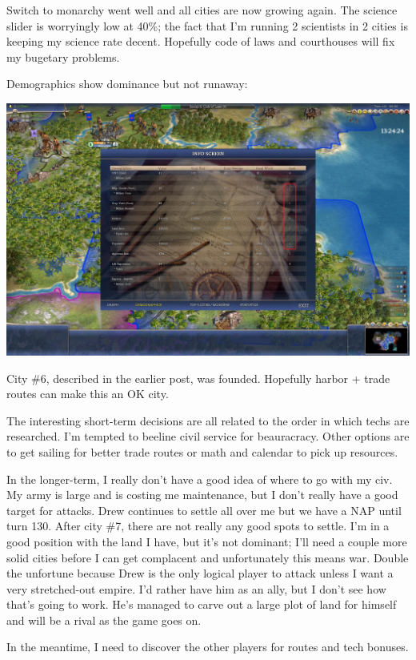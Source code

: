 \documentclass[10pt]{article}
\begin{document}
Switch to monarchy went well and all cities are now growing again. The
science slider is worryingly low at 40\%; the fact that I'm running 2
scientists in 2 cities is keeping my science rate decent. Hopefully
code of laws and courthouses will fix my bugetary problems.

Demographics show dominance but not runaway:

\includegraphics[width=1.0\textwidth]{turn103}

City \#6, described in the earlier post, was founded. Hopefully harbor + trade routes can make this an OK city.

The interesting short-term decisions are all related to the order in
which techs are researched. I'm tempted to beeline civil service for
beauracracy. Other options are to get sailing for better trade routes
or math and calendar to pick up resources.

In the longer-term, I really don't have a good idea of where to go
with my civ. My army is large and is costing me maintenance, but I
don't really have a good target for attacks. Drew continues to settle
all over me but we have a NAP until turn 130. After city \#7, there are
not really any good spots to settle. I'm in a good position with the
land I have, but it's not dominant; I'll need a couple more solid
cities before I can get complacent and unfortunately this means
war. Double the unfortune because Drew is the only logical player to
attack unless I want a very stretched-out empire. I'd rather have him
as an ally, but I don't see how that's going to work. He's managed to
carve out a large plot of land for himself and will be a rival as the
game goes on.

In the meantime, I need to discover the other players for routes and tech bonuses.
\end{document}
